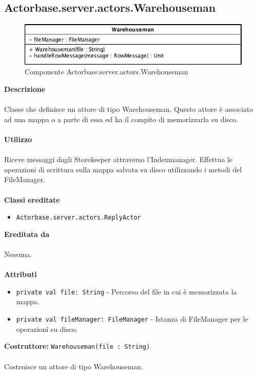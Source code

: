 \documentclass[a4paper]{article}
\begin{document}
			
	\subsection{Actorbase.server.actors.Warehouseman}
		\begin{figure}[H]
			\centering
			\includegraphics[scale = 0.6]{Server/warehouseman.jpg}
			\caption{Componente Actorbase.server.actors.Warehouseman}
		\end{figure}
		\textbf{Descrizione}
			\\ \\
			Classe che definisce un attore di tipo Warehouseman. Questo attore è associato ad una mappa o a parte di essa ed ha il compito di memorizzarla su disco.
			\\ \\
		\textbf{Utilizzo}
			\\ \\
			Riceve messaggi dagli Storekeeper attraverso l'Indexmanager. Effettua le operazioni di scrittura sulla mappa salvata su disco utilizzando i metodi del FileManager.
			\\ \\
		\textbf{Classi ereditate}
			\begin{itemize}
				\item \texttt{Actorbase.server.actors.ReplyActor}
			\end{itemize}
		\textbf{Ereditata da}
			\\ \\
			Nessuna.
			\\ \\
		\textbf{Attributi}
			\begin{itemize}
				\item \texttt{private val file: String} - Percorso del file in cui è memorizzata la mappa.
				\item \texttt{private val fileManager: FileManager}	- Istanza di FileManager per le operazioni su disco.
			\end{itemize}
		\textbf{Costruttore: }\texttt{Warehouseman(file : String)}
			\\ \\
		Costruisce un attore di tipo Warehouseman. 
			\\ \\
\end{document}
